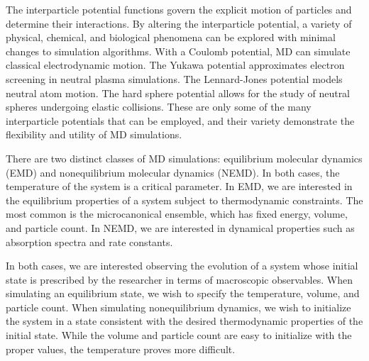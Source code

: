 \documentclass{article}
\begin{document}
The interparticle potential functions govern the explicit motion of particles and determine their interactions. By altering the interparticle potential, a variety of physical, chemical, and biological phenomena can be explored with minimal changes to simulation algorithms. With a Coulomb potential, MD can simulate classical electrodynamic motion. The Yukawa potential approximates electron screening in neutral plasma simulations. The Lennard-Jones potential models neutral atom motion. The hard sphere potential allows for the study of neutral spheres undergoing elastic collisions. These are only some of the many interparticle potentials that can be employed, and their variety demonstrate the flexibility and utility of MD simulations.


There are two distinct classes of MD simulations: equilibrium molecular dynamics (EMD) and nonequilibrium molecular dynamics (NEMD). In both cases, the temperature of the system is a critical parameter. In EMD, we are interested in the equilibrium properties of a system subject to thermodynamic constraints. The most common is the microcanonical ensemble, which has fixed energy, volume, and particle count. In NEMD, we are interested in dynamical properties such as absorption spectra and rate constants.

In both cases, we are interested observing the evolution of a system whose initial state is prescribed by the researcher in terms of macroscopic observables. When simulating an equilibrium state, we wish to specify the temperature, volume, and particle count. When simulating nonequilibrium dynamics, we wish to initialize the system in a state consistent with the desired thermodynamic properties of the initial state. While the volume and particle count are easy to initialize with the proper values, the temperature proves more difficult.
\end{document}
